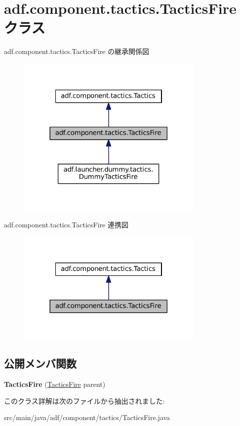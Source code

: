 \hypertarget{classadf_1_1component_1_1tactics_1_1TacticsFire}{}\section{adf.\+component.\+tactics.\+Tactics\+Fire クラス}
\label{classadf_1_1component_1_1tactics_1_1TacticsFire}


adf.\+component.\+tactics.\+Tactics\+Fire の継承関係図
\nopagebreak
\begin{figure}[H]
\begin{center}
\leavevmode
\includegraphics[width=258pt]{classadf_1_1component_1_1tactics_1_1TacticsFire__inherit__graph}
\end{center}
\end{figure}


adf.\+component.\+tactics.\+Tactics\+Fire 連携図
\nopagebreak
\begin{figure}[H]
\begin{center}
\leavevmode
\includegraphics[width=258pt]{classadf_1_1component_1_1tactics_1_1TacticsFire__coll__graph}
\end{center}
\end{figure}
\subsection*{公開メンバ関数}
\begin{DoxyCompactItemize}
\item 
\hypertarget{classadf_1_1component_1_1tactics_1_1TacticsFire_a31074d71861fe05becde32e81ee42ad5}{}\label{classadf_1_1component_1_1tactics_1_1TacticsFire_a31074d71861fe05becde32e81ee42ad5} 
{\bfseries Tactics\+Fire} (\hyperlink{classadf_1_1component_1_1tactics_1_1TacticsFire}{Tactics\+Fire} parent)
\end{DoxyCompactItemize}


このクラス詳解は次のファイルから抽出されました\+:\begin{DoxyCompactItemize}
\item 
src/main/java/adf/component/tactics/Tactics\+Fire.\+java\end{DoxyCompactItemize}
